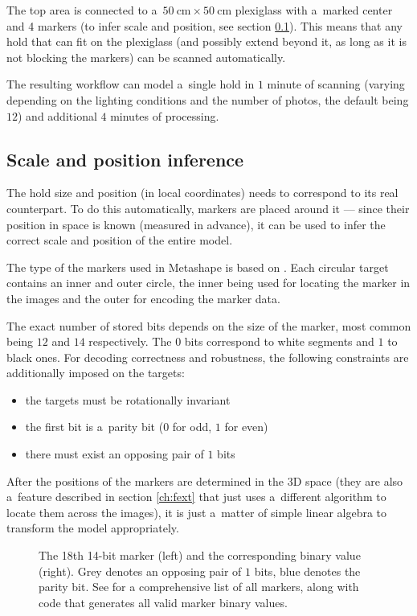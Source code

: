 The top area is connected to a~$\SI{50}{\centi\meter} \times \SI{50}{\centi\meter}$ plexiglass with a~marked center and 4 markers (to infer scale and position, see section \ref{sec:markersss}). This means that any hold that can fit on the plexiglass (and possibly extend beyond it, as long as it is not blocking the markers) can be scanned automatically.

The resulting workflow can model a~single hold in $1$ minute of scanning (varying depending on the lighting conditions and the number of photos, the default being $12$) and additional $4$ minutes of processing.

\subsection{Scale and position inference}\label{sec:markersss}
The hold size and position (in local coordinates) needs to correspond to its real counterpart.
To do this automatically, markers are placed around it --- since their position in space is known (measured in advance), it can be used to infer the correct scale and position of the entire model.

The type of the markers used in Metashape is based on \citet{schneider19913,borisPatent}.
Each circular target contains an inner and outer circle, the inner being used for locating the marker in the images and the outer for encoding the marker data.

The exact number of stored bits depends on the size of the marker, most common being $12$ and $14$ respectively.
The $0$ bits correspond to white segments and $1$ to black ones.
For decoding correctness and robustness, the following constraints are additionally imposed on the targets:

\begin{itemize}
	\item the targets must be rotationally invariant
	\item the first bit is a~parity bit ($0$ for odd, $1$ for even)
	\item there must exist an opposing pair of $1$ bits
\end{itemize}

After the positions of the markers are determined in the 3D space (they are also a~feature described in section \ref{ch:fext} that just uses a~different algorithm to locate them across the images), it is just a~matter of simple linear algebra to transform the model appropriately.

\begin{figure}[t]
	\centering
	
	\caption{The 18th 14-bit marker (left) and the corresponding binary value (right). Grey denotes an opposing pair of $1$ bits, blue denotes the parity bit. See \citet{targetsPost} for a comprehensive list of all markers, along with code that generates all valid marker binary values.}
\end{figure}

